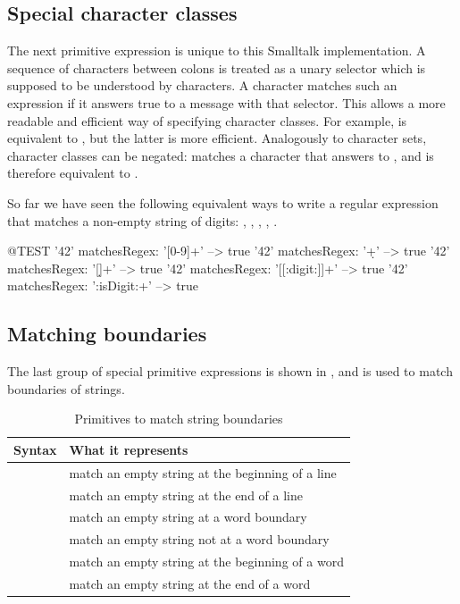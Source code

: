 \documentclass[a4paper,10pt,twoside]{book}
\begin{document}
{%
\subsection{Special character classes}
The next primitive expression is unique to this Smalltalk implementation. A sequence of characters between colons is treated as a unary selector which is supposed to be understood by characters. A character matches such an expression if it answers true to a message with that selector. This allows a more readable and efficient way of specifying character classes. For example, \ct{[0-9]} is equivalent to , but the latter is more efficient. Analogously to character sets, character classes can be negated:  matches a character that answers  to , and is therefore equivalent to \ct{[CARET0-9]}.

So far we have seen the following equivalent ways to write a regular expression that matches a non-empty string of digits: \ct{[0-9]+}, \ct{\d+}, \ct{[\d]+}, \ct{[[:digit:]]+}, .

\begin{code}{@TEST}
'42' matchesRegex: '[0-9]+'      --> true
'42' matchesRegex: '\d+'           --> true
'42' matchesRegex: '[\d]+'         --> true
'42' matchesRegex: '[[:digit:]]+' --> true
'42' matchesRegex: ':isDigit:+'  --> true
\end{code}

\subsection{Matching boundaries}
The last group of special primitive expressions is shown in , and is used to match boundaries of strings.

\begin{table}[htb]
\centering
	\begin{tabular}{lp{8cm}}
		\toprule
		Syntax & What it represents \\
		\midrule
		\lct{\caret} & match an empty string at the beginning of a line\\
		\lct{\$} & match an empty string at the end of a line\\
		\lct{{\escape}b} & match an empty string at a word boundary\\
		\lct{{\escape}B} & match an empty string not at a word boundary\\
		\lct{{\escape}<} & match an empty string at the beginning of a word\\
		\lct{{\escape}>} & match an empty string at the end of a word\\
		\bottomrule
	\end{tabular}
	\caption{Primitives to match string boundaries\label{tab:boundaries}}
\end{table}

}
\end{document}
